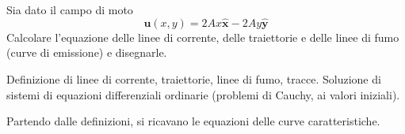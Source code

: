 \begin{exerciseS}
 Sia dato il campo di moto
\begin{equation}
 \bm{u}(x,y) = 2Ax \bm{\hat{x}} - 2Ay \bm{\hat{y}} 
\end{equation}
Calcolare l'equazione delle linee di corrente, delle traiettorie e delle linee di fumo (curve di emissione) e disegnarle.
\end{exerciseS}


\sol

\partone Definizione di linee di corrente, traiettorie, linee di fumo, tracce. Soluzione di sistemi di equazioni differenziali ordinarie (problemi di Cauchy, ai valori iniziali).

\parttwo
Partendo dalle definizioni, si ricavano le equazioni delle curve caratteristiche. 
